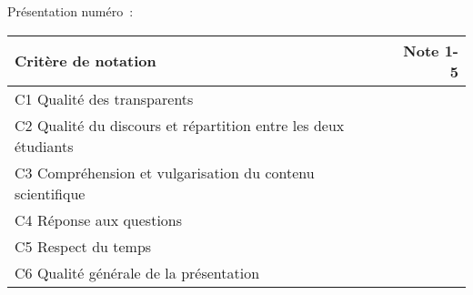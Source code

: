 \documentclass[11pt,b5paper]{article}
\begin{document}
\pagestyle{empty}

\begin{landscape}

\centering
\Huge

Présentation numéro~: \fbox{| \hspace*{2cm} |} \newline

\huge

\begin{tabular}{l|r}

\toprule
\textbf{Critère de notation} & \textbf{Note 1-5} \\
\midrule

C1 Qualité des transparents & ~ \\ \midrule
C2 Qualité du discours et répartition entre les deux étudiants & ~ \\ \midrule
C3 Compréhension et vulgarisation du contenu scientifique & ~ \\ \midrule
C4 Réponse aux questions & ~ \\ \midrule
C5 Respect du temps & ~ \\ \midrule
C6 Qualité générale de la présentation & ~ \\

\bottomrule
\end{tabular}

\Huge

~\newline


\end{landscape}
\end{document}

